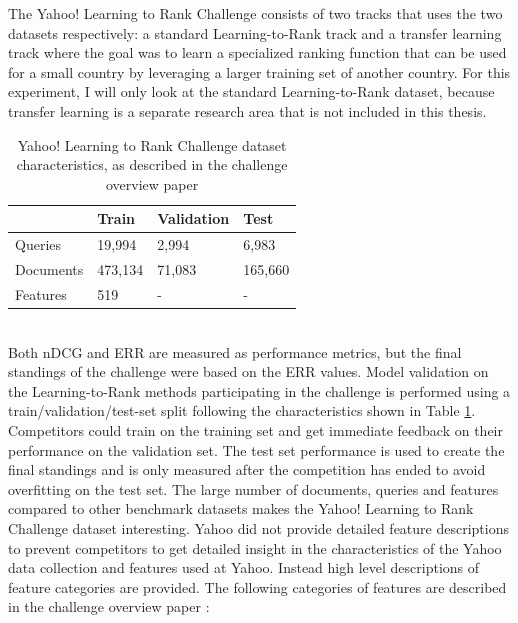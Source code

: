 The Yahoo! Learning to Rank Challenge consists of two tracks that uses the two datasets respectively: a standard Learning-to-Rank track and a transfer learning track where the goal was to learn a specialized ranking function that can be used for a small country by leveraging a larger training set of another country. For this experiment, I will only look at the standard Learning-to-Rank dataset, because transfer learning is a separate research area that is not included in this thesis.\\
\begin{table}[!h]
\begin{tabular}{l|lll}
 & Train & Validation & Test \\ 
 \hline
Queries & 19,994 & 2,994 & 6,983 \\ 
Documents & 473,134 & 71,083 & 165,660 \\ 
Features & 519 & - & - \\ 
\end{tabular}
\caption{Yahoo! Learning to Rank Challenge dataset characteristics, as described in the challenge overview paper \cite{Chapelle2011a}}
\label{tab:yahoo_characteristics}
\end{table}\\
Both \ac{nDCG} and \ac{ERR} are measured as performance metrics, but the final standings of the challenge were based on the \ac{ERR} values. Model validation on the Learning-to-Rank methods participating in the challenge is performed using a train/validation/test-set split following the characteristics shown in Table \ref{tab:yahoo_characteristics}. Competitors could train on the training set and get immediate feedback on their performance on the validation set. The test set performance is used to create the final standings and is only measured after the competition has ended to avoid overfitting on the test set. The large number of documents, queries and features compared to other benchmark datasets makes the Yahoo! Learning to Rank Challenge dataset interesting. Yahoo did not provide detailed feature descriptions to prevent competitors to get detailed insight in the characteristics of the Yahoo data collection and features used at Yahoo. Instead high level descriptions of feature categories are provided. The following categories of features are described in the challenge overview paper \cite{Chapelle2011a}:\\
